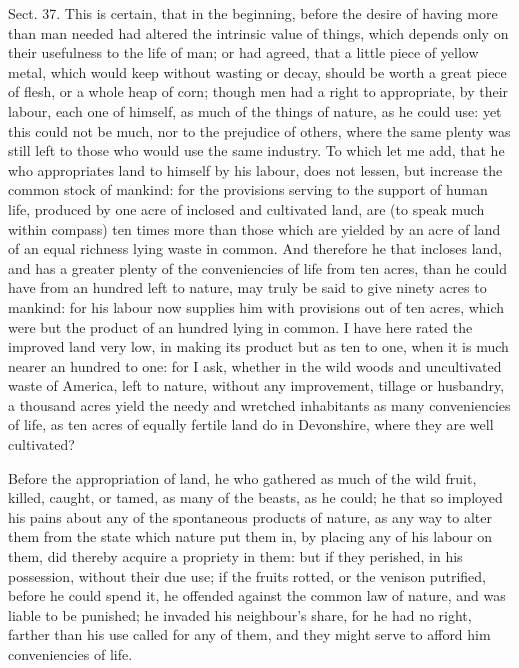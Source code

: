\documentclass[11pt,openany]{book}
\begin{document}
Sect. 37. This is certain, that in the beginning, before the desire of having more than man needed had altered the intrinsic value of things, which depends only on their usefulness to the life of man; or had agreed, that a little piece of yellow metal, which would keep without wasting or decay, should be worth a great piece of flesh, or a whole heap of corn; though men had a right to appropriate, by their labour, each one of himself, as much of the things of nature, as he could use: yet this could not be much, nor to the prejudice of others, where the same plenty was still left to those who would use the same industry. To which let me add, that he who appropriates land to himself by his labour, does not lessen, but increase the common stock of mankind: for the provisions serving to the support of human life, produced by one acre of inclosed and cultivated land, are (to speak much within compass) ten times more than those which are yielded by an acre of land of an equal richness lying waste in common. And therefore he that incloses land, and has a greater plenty of the conveniencies of life from ten acres, than he could have from an hundred left to nature, may truly be said to give ninety acres to mankind: for his labour now supplies him with provisions out of ten acres, which were but the product of an hundred lying in common. I have here rated the improved land very low, in making its product but as ten to one, when it is much nearer an hundred to one: for I ask, whether in the wild woods and uncultivated waste of America, left to nature, without any improvement, tillage or husbandry, a thousand acres yield the needy and wretched inhabitants as many conveniencies of life, as ten acres of equally fertile land do in Devonshire, where they are well cultivated?

Before the appropriation of land, he who gathered as much of the wild fruit, killed, caught, or tamed, as many of the beasts, as he could; he that so imployed his pains about any of the spontaneous products of nature, as any way to alter them from the state which nature put them in, by placing any of his labour on them, did thereby acquire a propriety in them: but if they perished, in his possession, without their due use; if the fruits rotted, or the venison putrified, before he could spend it, he offended against the common law of nature, and was liable to be punished; he invaded his neighbour's share, for he had no right, farther than his use called for any of them, and they might serve to afford him conveniencies of life.
\end{document}
